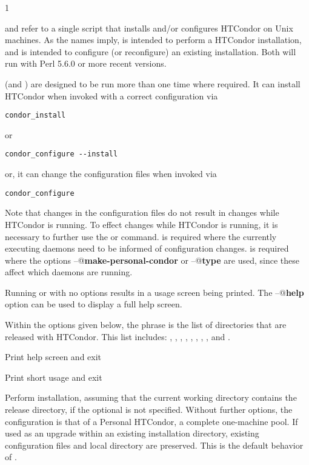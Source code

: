 \begin{ManPage}{\label{man-condor-configure}}{1}
\Description 

 and  refer to a single script that installs
and/or configures HTCondor on Unix machines.  As the names imply,
 is intended to perform a HTCondor installation, and
 is intended to configure (or reconfigure) an
existing installation.
Both will run with Perl 5.6.0 or more recent versions.

 (and ) are designed to be run more
than one time where required.
It can install HTCondor when invoked with a correct configuration via
\begin{verbatim}
condor_install
\end{verbatim}
or 
\begin{verbatim}
condor_configure --install
\end{verbatim}
or, it can change the configuration files when invoked via
\begin{verbatim}
condor_configure
\end{verbatim}
Note that changes in the configuration files do not result
in changes while HTCondor is running.
To effect changes while HTCondor is running,
it is necessary to further use the  or 
command.
  is required where the currently executing
daemons need to be informed of configuration changes.
 is required where the options
\verb@--@\textbf{make-personal-condor} or
\verb@--@\textbf{type}
are used, since these affect which daemons are running.

Running  or  with no options results
in a usage screen being printed.
The \verb@--@\textbf{help} option can be used to display a full help screen.

Within the options given below, 
the phrase  is the list of directories that are
released with HTCondor.  This list includes: 
, , , ,
, , , ,
 and .

\begin{Options}
   {Print help screen and exit}

   {Print short usage and exit}

   {Perform installation, 
    assuming that
    the current working directory contains the release directory,
    if the optional  is not specified.
    Without further options, the configuration is that of
    a Personal HTCondor, a complete one-machine pool.
    If used as an 
    upgrade within an existing installation directory, existing 
    configuration files and local directory are preserved.  This
    is the default behavior of . }


\end{Options}
\end{ManPage}
